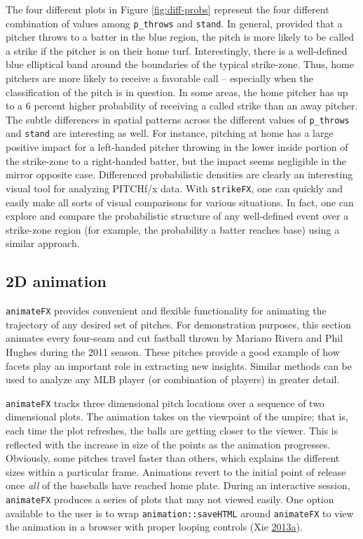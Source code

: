 \documentclass[12pt,]{isuthesis}
\begin{document}
The four different plots in Figure \ref{fig:diff-probs} represent the
four different combination of values among \texttt{p\_throws} and
\texttt{stand}. In general, provided that a pitcher throws to a batter
in the blue region, the pitch is more likely to be called a strike if
the pitcher is on their home turf. Interestingly, there is a
well-defined blue elliptical band around the boundaries of the typical
strike-zone. Thus, home pitchers are more likely to receive a favorable
call -- especially when the classification of the pitch is in question.
In some areas, the home pitcher has up to a 6 percent higher probability
of receiving a called strike than an away pitcher. The subtle
differences in spatial patterns across the different values of
\texttt{p\_throws} and \texttt{stand} are interesting as well. For
instance, pitching at home has a large positive impact for a left-handed
pitcher throwing in the lower inside portion of the strike-zone to a
right-handed batter, but the impact seems negligible in the mirror
opposite case. Differenced probabilistic densities are clearly an
interesting visual tool for analyzing PITCHf/x data. With
\texttt{strikeFX}, one can quickly and easily make all sorts of visual
comparisons for various situations. In fact, one can explore and compare
the probabilistic structure of any well-defined event over a strike-zone
region (for example, the probability a batter reaches base) using a
similar approach.

\subsection{2D animation}\label{d-animation}

\texttt{animateFX} provides convenient and flexible functionality for
animating the trajectory of any desired set of pitches. For
demonstration purposes, this section animates every four-seam and cut
fastball thrown by Mariano Rivera and Phil Hughes during the 2011
season. These pitches provide a good example of how facets play an
important role in extracting new insights. Similar methods can be used
to analyze any MLB player (or combination of players) in greater detail.

\texttt{animateFX} tracks three dimensional pitch locations over a
sequence of two dimensional plots. The animation takes on the viewpoint
of the umpire; that is, each time the plot refreshes, the balls are
getting closer to the viewer. This is reflected with the increase in
size of the points as the animation progresses. Obviously, some pitches
travel faster than others, which explains the different sizes within a
particular frame. Animations revert to the initial point of release once
\emph{all} of the baseballs have reached home plate. During an
interactive session, \texttt{animateFX} produces a series of plots that
may not viewed easily. One option available to the user is to wrap
\texttt{animation::saveHTML} around \texttt{animateFX} to view the
animation in a browser with proper looping controls (Xie
\protect\hyperlink{ref-animation}{2013}\protect\hyperlink{ref-animation}{a}).
\end{document}
